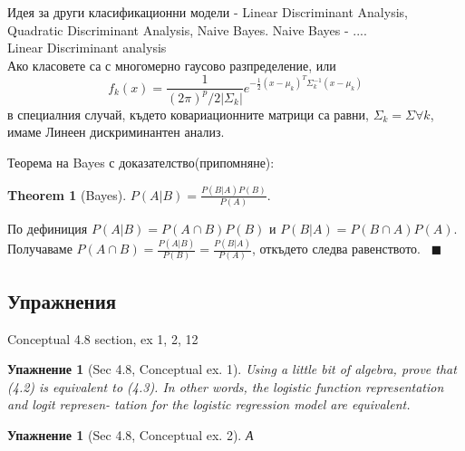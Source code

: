 \documentclass{article}
\newtheorem{exercise}[subsubsection]{Упажнение}
\newtheorem{theorem}{Theorem}
\newenvironment{proof}{{\sc доказателство:}}{~\hfill $\blacksquare$ }
\begin{document}
	Идея за други класификационни модели - Linear Discriminant Analysis, Quadratic Discriminant Analysis, Naive Bayes.
	Naive Bayes - .... \\
	Linear Discriminant analysis \\
	Ако класовете са с многомерно гаусово разпределение, или
	$$f_k(x) = \frac{1}{(2\pi)^p/2 \left | \Sigma_k  \right |} e^{-\frac{1}{2} (x-\mu_k)^T \Sigma_k^{-1}(x-\mu_k)} $$
	в специалния случай, където ковариационните матрици са равни, $\Sigma_k = \Sigma \forall k$, имаме 
	Линеен дискриминантен анализ.
	
	Теорема на Bayes с доказателство(припомняне): 
	\begin{theorem}[Bayes]
		$P(A|B) = \frac{P(B|A)P(B)}{P(A)}.$
	\end{theorem}
	\begin{proof}
		По дефиниция $P(A|B) = P(A\cap B)P(B)$ и $P(B|A) = P(B\cap A)P(A)$. Получаваме
	 $P(A\cap B)= \frac{P(A|B) }{P(B)} = \frac{P(B|A) }{P(A)}$, откъдето следва равенството.
	\end{proof}

	
	\subsection{Упражнения}
	Conceptual 4.8 section, ex 1, 2, 12 \\

	\begin{exercise}[Sec 4.8, Conceptual ex. 1]
			Using a little bit of algebra, prove that (4.2) is equivalent to (4.3). In
		other words, the logistic function representation and logit represen-
		tation for the logistic regression model are equivalent.
	\end{exercise}

	\begin{exercise}[Sec 4.8, Conceptual ex. 2]
		А
	\end{exercise}
\end{document}
